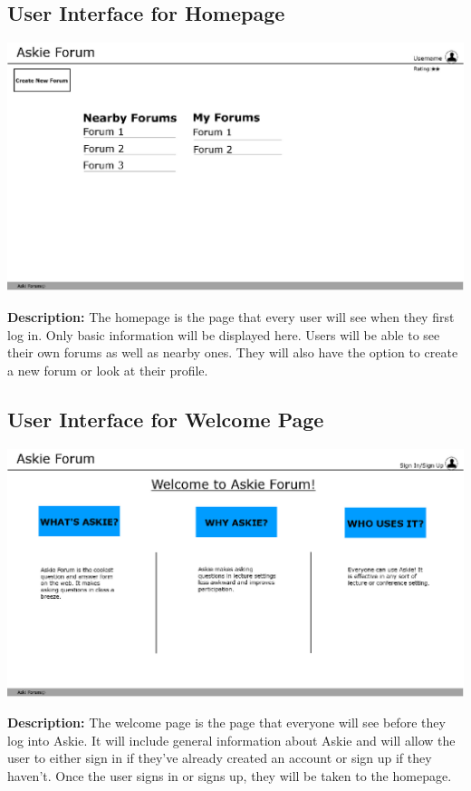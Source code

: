 \documentclass[12pt]{article}
\begin{document}
\subsection{User Interface for Homepage}
\includegraphics[width=\textwidth]{Askie_Forum_Homepage_UI}
\begin{flushleft}
\textbf{Description:} The homepage is the page that every user will see when they first log in. Only basic information will be displayed here. Users will be able to see their own forums as well as nearby ones. They will also have the option to create a new forum or look at their profile. 
\end{flushleft}

\subsection{User Interface for Welcome Page}
\includegraphics[width=\textwidth]{Askie_Forum_Homepage_UI_logged_out}
\begin{flushleft}
\textbf{Description:} The welcome page is the page that everyone will see before they log into Askie. It will include general information about Askie and will allow the user to either sign in if they've already created an account or sign up if they haven't. Once the user signs in or signs up, they will be taken to the homepage.
\end{flushleft}
\end{document}
